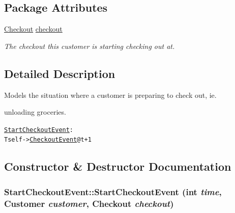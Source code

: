 \subsection*{Package Attributes}
\begin{CompactItemize}
\item 
\hypertarget{class_start_checkout_event_3db09638992a567fbbf7a62e5d877a86}{
\hyperlink{class_checkout}{Checkout} \hyperlink{class_start_checkout_event_3db09638992a567fbbf7a62e5d877a86}{checkout}}
\label{class_start_checkout_event_3db09638992a567fbbf7a62e5d877a86}

\begin{CompactList}\small\item\em The checkout this customer is starting checking out at. \item\end{CompactList}\end{CompactItemize}


\subsection{Detailed Description}
Models the situation where a customer is preparing to check out, ie. 

unloading groceries.

\small\begin{alltt}
 \hyperlink{class_start_checkout_event}{StartCheckoutEvent}:
   T self -> \hyperlink{class_checkout_event}{CheckoutEvent} @ t+1
 \end{alltt}
\normalsize 
 

\subsection{Constructor \& Destructor Documentation}
\hypertarget{class_start_checkout_event_54269b423446f7a7272c3fb8ac2795ed}{
\subsubsection[{StartCheckoutEvent}]{\setlength{\rightskip}{0pt plus 5cm}StartCheckoutEvent::StartCheckoutEvent (int {\em time}, \/  {\bf Customer} {\em customer}, \/  {\bf Checkout} {\em checkout})}}
\label{class_start_checkout_event_54269b423446f7a7272c3fb8ac2795ed}


